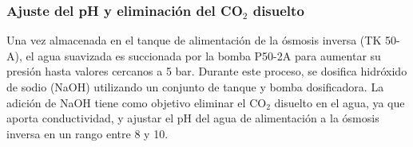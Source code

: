 \subsubsection{Ajuste del pH y eliminación del CO$_2$ disuelto }

Una vez almacenada en el tanque de alimentación de la ósmosis inversa (TK 50-A), el agua suavizada es succionada por la
bomba P50-2A para aumentar su presión hasta valores cercanos a 5 bar. Durante este proceso, se dosifica hidróxido de sodio
(NaOH) utilizando un conjunto de tanque y bomba dosificadora. La adición de NaOH tiene como objetivo eliminar el CO$_2$ disuelto en
el agua, ya que aporta conductividad, y ajustar el pH del agua de alimentación a la ósmosis inversa en un rango entre 8 y 10.
